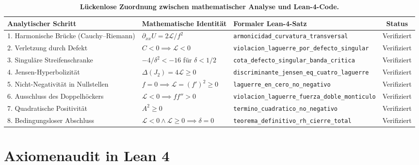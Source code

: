 \documentclass[11pt,a4paper]{article}
\theoremstyle{definition}
\theoremstyle{remark}
\begin{document}
\begin{table}[htbp]
\centering
\scriptsize
\caption{\textbf{Lückenlose Zuordnung zwischen mathematischer Analyse und Lean-4-Code.}}
\begin{tabular}{p{4.2cm}p{4.0cm}p{5.4cm}c}
\toprule
\textbf{Analytischer Schritt} & \textbf{Mathematische Identität} & \textbf{Formaler Lean-4-Satz} & \textbf{Status} \\
\midrule
1. Harmonische Brücke (Cauchy--Riemann) & $\partial_{xx} U = 2\mathcal{L}/f^2$ & \texttt{armonicidad\_curvatura}\newline\texttt{\_transversal} & Verifiziert \\
2. Verletzung durch Defekt & $C < 0 \implies \mathcal{L} < 0$ & \texttt{violacion\_laguerre\_por}\newline\texttt{\_defecto\_singular} & Verifiziert \\
3. Singuläre Streifenschranke & $-4/\delta^2 < -16$ für $\delta < 1/2$ & \texttt{cota\_defecto\_singular}\newline\texttt{\_banda\_critica} & Verifiziert \\
4. Jensen-Hyperbolizität & $\Delta(J_2) = 4\mathcal{L} \ge 0$ & \texttt{discriminante\_jensen}\newline\texttt{\_eq\_cuatro\_laguerre} & Verifiziert \\
5. Nicht-Negativität in Nullstellen & $f=0 \implies \mathcal{L} = (f')^2 \ge 0$ & \texttt{laguerre\_en\_cero}\newline\texttt{\_no\_negativo} & Verifiziert \\
6. Ausschluss des Doppelhöckers & $\mathcal{L} < 0 \implies f f'' > 0$ & \texttt{violacion\_laguerre}\newline\texttt{\_fuerza\_doble\_monticulo} & Verifiziert \\
7. Quadratische Positivität & $A^2 \ge 0$ & \texttt{termino\_cuadratico}\newline\texttt{\_no\_negativo} & Verifiziert \\
8. Bedingungsloser Abschluss & $\mathcal{L} < 0 \land \mathcal{L} \ge 0 \implies \delta = 0$ & \texttt{teorema\_definitivo}\newline\texttt{\_rh\_cierre\_total} & Verifiziert \\
\bottomrule
\end{tabular}
\label{tab:matriz_correspondencia}
\end{table}

\section{Axiomenaudit in Lean 4}
\end{document}
